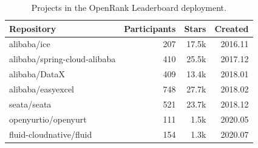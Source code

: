 \begin{table}[tbp]
\centering
\caption{Projects in the OpenRank Leaderboard deployment.}\label{tab:ch6-projects}
\fontsize{9.5}{12}\selectfont
\renewcommand{\arraystretch}{1.13}
\begin{tabularx}{\textwidth}{@{}>{\raggedright\arraybackslash}Xrrr@{}}
\toprule
Repository & Participants & Stars & Created\\
\midrule
alibaba/ice & 207 & 17.5k & 2016.11\\
alibaba/spring-cloud-alibaba & 410 & 25.5k & 2017.12\\
alibaba/DataX & 409 & 13.4k & 2018.01\\
alibaba/easyexcel & 748 & 27.7k & 2018.02\\
seata/seata & 521 & 23.7k & 2018.12\\
openyurtio/openyurt & 111 & 1.5k & 2020.05\\
fluid-cloudnative/fluid & 154 & 1.3k & 2020.07\\
\bottomrule
\end{tabularx}
\end{table}
